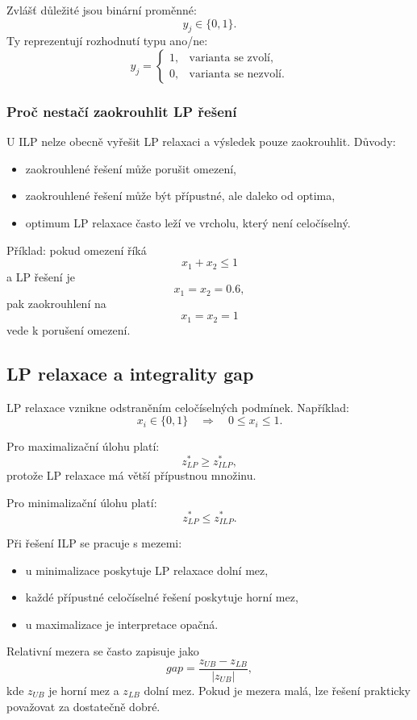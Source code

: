 Zvlášť důležité jsou binární proměnné:
\[
y_j\in\{0,1\}.
\]
Ty reprezentují rozhodnutí typu ano/ne:
\[
y_j=
\begin{cases}
1, & \text{varianta se zvolí,}\\
0, & \text{varianta se nezvolí.}
\end{cases}
\]

\subsubsection{Proč nestačí zaokrouhlit LP řešení}

U ILP nelze obecně vyřešit LP relaxaci a výsledek pouze zaokrouhlit. Důvody:
\begin{itemize}
    \item zaokrouhlené řešení může porušit omezení,
    \item zaokrouhlené řešení může být přípustné, ale daleko od optima,
    \item optimum LP relaxace často leží ve vrcholu, který není celočíselný.
\end{itemize}

Příklad: pokud omezení říká
\[
x_1+x_2\le 1
\]
a LP řešení je
\[
x_1=x_2=0.6,
\]
pak zaokrouhlení na
\[
x_1=x_2=1
\]
vede k porušení omezení.

\subsection{LP relaxace a integrality gap}

LP relaxace vznikne odstraněním celočíselných podmínek. Například:
\[
x_i\in\{0,1\}
\quad\Rightarrow\quad
0\le x_i\le 1.
\]

Pro maximalizační úlohu platí:
\[
z^*_{LP}\ge z^*_{ILP},
\]
protože LP relaxace má větší přípustnou množinu.

Pro minimalizační úlohu platí:
\[
z^*_{LP}\le z^*_{ILP}.
\]

Při řešení ILP se pracuje s mezemi:
\begin{itemize}
    \item u minimalizace poskytuje LP relaxace dolní mez,
    \item každé přípustné celočíselné řešení poskytuje horní mez,
    \item u maximalizace je interpretace opačná.
\end{itemize}

Relativní mezera se často zapisuje jako
\[
gap=
\frac{z_{UB}-z_{LB}}{|z_{UB}|},
\]
kde $z_{UB}$ je horní mez a $z_{LB}$ dolní mez. Pokud je mezera malá, lze řešení prakticky považovat
za dostatečně dobré.

